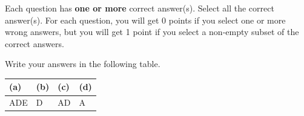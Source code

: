 
Each question has \textbf{one or more} correct answer(s). Select all the correct answer(s). For each question, you will get 0 points if you select one or more wrong answers, but you will get 1 point if you select a non-empty subset of the correct answers.

Write your answers in the following table.


\begin{table}[h]
    \centering
    \renewcommand{\arraystretch}{1.25}
    \begin{tabular}{|p{2cm}|p{2cm}|p{2cm}|p{2cm}|}
        \hline 
        (a) & (b) & (c) & (d)\\
        \hline
        ADE & D & AD & A \\
        \hline
    \end{tabular}
\end{table}

